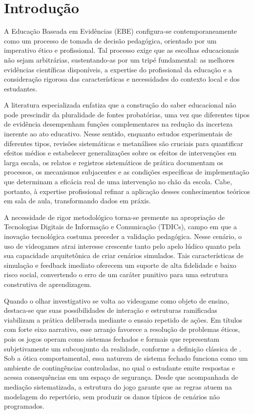\documentclass[portuguese]{textolivre}
\begin{document}
\section{Introdução}\label{sec-intro}
A Educação Baseada em Evidências (EBE) configura-se contemporaneamente como um processo de tomada de decisão pedagógica, orientado por um imperativo ético e profissional. Tal processo exige que as escolhas educacionais não sejam arbitrárias, sustentando-as por um tripé fundamental: as melhores evidências científicas disponíveis, a expertise do profissional da educação e a consideração rigorosa das características e necessidades do contexto local e dos estudantes.

A literatura especializada \cite{davies1999evidence,slavin1996education,young2016conhecimento} enfatiza que a construção do saber educacional não pode prescindir da pluralidade de fontes probatórias, uma vez que diferentes tipos de evidência desempenham funções complementares na redução da incerteza inerente ao ato educativo. Nesse sentido, enquanto estudos experimentais de diferentes tipos, revisões sistemáticas e metanálises são cruciais para quantificar efeitos médios e estabelecer generalizações sobre os efeitos de intervenções em larga escala, os relatos e registros sistemáticos de prática documentam os processos, os mecanismos subjacentes e as condições específicas de implementação que determinam a eficácia real de uma intervenção no chão da escola. Cabe, portanto, à expertise profissional refinar a aplicação desses conhecimentos teóricos em sala de aula, transformando dados em práxis.

A necessidade de rigor metodológico torna-se premente na apropriação de Tecnologias Digitais de Informação e Comunicação (TDICs), campo em que a inovação tecnológica costuma preceder a validação pedagógica. Nesse cenário, o uso de videogames atrai interesse crescente tanto pelo apelo lúdico quanto pela sua capacidade arquitetônica de criar cenários simulados. Tais características de simulação e feedback imediato oferecem um suporte de alta fidelidade e baixo risco social, convertendo o erro de um caráter punitivo para uma estrutura construtiva de aprendizagem.

Quando o olhar investigativo se volta ao videogame como objeto de ensino, destaca-se que suas possibilidades de interação e estruturas ramificadas viabilizam a prática deliberada mediante o ensaio repetido de ações. Em títulos com forte eixo narrativo, esse arranjo favorece a resolução de problemas éticos, pois os jogos operam como sistemas fechados e formais que representam subjetivamente um subconjunto da realidade, conforme a definição clássica de \textcite{crawford1984art}. Sob a ótica comportamental, essa natureza de sistema fechado funciona como um ambiente de contingências controladas, no qual o estudante emite respostas e acessa consequências em um espaço de segurança. Desde que acompanhada de mediação sistematizada, a estrutura do jogo garante que as regras atuem na modelagem do repertório, sem produzir os danos típicos de cenários não programados.
\end{document}

